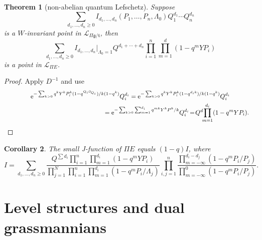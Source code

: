 \documentclass[10pt,a4paper]{amsart}
\numberwithin{equation}{section}
\newtheorem{Theorem}{Theorem}[section]
\newtheorem{Corollary}[Theorem]{Corollary}
\def\L{\mathcal L}
\def\p{\partial}
\theoremstyle{definition}
\theoremstyle{plain}
\begin{document}
\begin{Theorem}[{non-abelian quantum Lefschetz}]\label{thm5}
Suppose
\[
\sum_{d_1,\dots,d_n\geq 0} I_{d_1,\dots,d_n}(P_1,\dots,P_n,\Lambda_0) Q_1^{d_1}\cdots Q_n^{d_n}
\]
is a $W$-invariant point in $\L_{\Pi \mathfrak{g}/\mathfrak{t}}$, then
\[
\sum_{d_1,\dots,d_n\geq 0}I_{d_1,\dots,d_n}|_{\Lambda_0=1} Q^{d_1+\cdots+d_n}\prod_{i=1}^n\prod_{m=1}^d(1-q^mYP_i)
\]
is a point in $\L_{\Pi E}$.
\end{Theorem}

\begin{proof}Apply $D^{-1}$ and use
\begin{gather*}
{\rm e}^{-\sum_{k>0} q^kY^kP_i^k(1-q^{Q_i\p_{Q_i}})/k(1-q^k)} Q_i^{d_i} = {\rm e}^{-\sum_{k>0}q^kY^kP_i^k(1-q^{d_ik})/k(1-q^k)} Q_i^{d_i}
\\ \hphantom{{\rm e}^{-\sum_{k>0} q^kY^kP_i^k(1-q^{Q_i\p_{Q_i}})/k(1-q^k)} Q_i^{d_i}}
{}= {\rm e}^{ -\sum_{k>0} \sum_{m=1}^{d_i} q^{mk}Y^kP^k/k} Q_i^{d_i}\! = \! Q^d\!\!\prod_{m=1}^{d_i}(1-q^mYP_i). \!\!\! \!\!\tag*{\qed}
\end{gather*}
\renewcommand{\qed}{}
\end{proof}


\begin{Corollary}\label{cor4}
The small J-function of $\Pi E$ equals $(1-q)I$, where
\[
I=\sum_{d_1,\dots,d_n\geq 0}\frac{Q^{\sum d_i}\prod_{i=1}^n\prod_{m=1}^{d_i}(1-q^mYP_i)}{\prod_{j=1}^N\prod_{i=1}^n
\prod_{m=1}^{d_i}(1-q^mP_i/\Lambda_j)}\prod_{i,j=1}^n
\frac{\prod_{m=-\infty}^{d_i-d_j}(1-q^mP_i/P_j)}{\prod_{m=-\infty}^0(1-q^mP_i/P_j)}.
\]
\end{Corollary}

\section{Level structures and dual grassmannians}
\label{Sec7}
\end{document}
